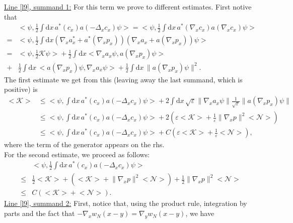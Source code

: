 \documentclass[11pt,a4paper]{scrartcl}
\newcommand{\di}{\textrm{d}}		%
\newcommand{\Ncal}{\mathcal{N}}		%
\newcommand{\Kcal}{\mathcal{K}}		%
\newcommand{\estlist}[2]{\underline{Line \ref{l#1}, summand #2:}}
\newcommand{\scal}[2]{\big<#1,#2\big>} %
\newcommand{\norm}[1]{\lVert#1\rVert}	%
\newcommand{\ev}[1]{\big<#1\big>}	%
\begin{document}
\estlist{9}{1}
For this term we prove to different estimates. First notive that
\begin{align*}
 & \scal{\psi}{\frac{1}{2}\int \di x\, a^\ast(c_x) a(-\Delta_x c_x)\psi} = \scal{\psi}{\frac{1}{2}\int \di x\, a^\ast(\nabla_x c_x)a(\nabla_x c_x)\psi} \\
= & \scal{\psi}{\frac{1}{2}\int \di x \left( \nabla_x a^\ast_x + a^\ast(\nabla_x p_x) \right)\left(  \nabla_x a_x + a(\nabla_x p_x) \right) \psi} \\
= & \scal{\psi}{\frac{1}{2}\Kcal \psi} + \frac{1}{2}\int \di x\scal{\nabla_x
a_x \psi}{a(\nabla_x p_x)\psi} \\
+ & \frac{1}{2}\int \di x\, \scal{a(\nabla_x p_x)\psi}{\nabla_x a_x \psi} + \frac{1}{2}\int \di x\, \norm{a(\nabla_x p_x)\psi}^2.
\end{align*}
The first estimate we get from this (leaving away the last summand, which is positive) is
\begin{equation}
\tag{A}
\label{eq:bound1A}
\begin{split}
 \ev{\Kcal} & \leq \scal{\psi}{\int \di x\, a^\ast(c_x) a(-\Delta_x c_x)\psi} + 2\int \di x\, \sqrt{\varepsilon} \norm{\nabla_x a_x \psi} \frac{1}{\sqrt{\varepsilon}} \norm{a(\nabla_x p_x)\psi} \\
& \leq \scal{\psi}{\int \di x\, a^\ast(c_x) a(-\Delta_x c_x)\psi} + 2\left( \varepsilon \ev{\Kcal} + \frac{1}{\varepsilon}  \norm{\nabla_x p}^2 \ev{\Ncal}\right) \\
& \leq \scal{\psi}{\int \di x\,a^\ast(c_x) a(-\Delta_x c_x)\psi} + C\left( \varepsilon \ev{\Kcal} + \frac{1}{\varepsilon}\ev{\Ncal} \right),
\end{split}
\end{equation}
where the term of the generator appears on the rhs.\\
For the second estimate, we proceed as follows:
\begin{equation}
\tag{B}
\label{eq:bound1B}
\begin{split}
 & \scal{\psi}{\frac{1}{2} \int \di x\, a^\ast(c_x) a(-\Delta_x c_x)\psi} \\
\leq & \frac{1}{2}\ev{\Kcal} + \left( \ev{\Kcal} + \norm{\nabla_x p}^2 \ev{\Ncal}\right) + \frac{1}{2}\norm{\nabla_x p}^2 \ev{\Ncal} \\
\leq & C\left( \ev{\Kcal} + \ev{\Ncal} \right).
\end{split}
\end{equation}
\estlist{9}{2}
First, notice that, using the product rule, integration by parts and the fact that $-\nabla_x w_N(x-y) = \nabla_y w_N(x-y)$, we have
\end{document}
